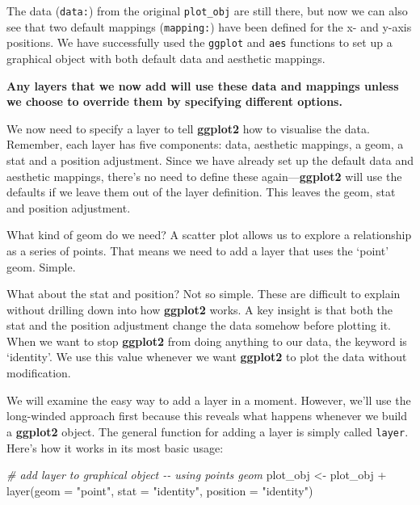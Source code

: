 \documentclass[
]{book}
\newenvironment{Shaded}{\begin{snugshade}}{\end{snugshade}}
\newcommand{\AttributeTok}[1]{\textcolor[rgb]{0.77,0.63,0.00}{#1}}
\newcommand{\CommentTok}[1]{\textcolor[rgb]{0.56,0.35,0.01}{\textit{#1}}}
\newcommand{\FunctionTok}[1]{\textcolor[rgb]{0.00,0.00,0.00}{#1}}
\newcommand{\NormalTok}[1]{#1}
\newcommand{\OtherTok}[1]{\textcolor[rgb]{0.56,0.35,0.01}{#1}}
\newcommand{\SpecialCharTok}[1]{\textcolor[rgb]{0.00,0.00,0.00}{#1}}
\newcommand{\StringTok}[1]{\textcolor[rgb]{0.31,0.60,0.02}{#1}}
\begin{document}
The data (\texttt{data:}) from the original \texttt{plot\_obj} are still there, but now we can also see that two default mappings (\texttt{mapping:}) have been defined for the x- and y-axis positions. We have successfully used the \texttt{ggplot} and \texttt{aes} functions to set up a graphical object with both default data and aesthetic mappings.

\textbf{Any layers that we now add will use these data and mappings unless we choose to override them by specifying different options.}

We now need to specify a layer to tell \textbf{ggplot2} how to visualise the data. Remember, each layer has five components: data, aesthetic mappings, a geom, a stat and a position adjustment. Since we have already set up the default data and aesthetic mappings, there's no need to define these again---\textbf{ggplot2} will use the defaults if we leave them out of the layer definition. This leaves the geom, stat and position adjustment.

What kind of geom do we need? A scatter plot allows us to explore a relationship as a series of points. That means we need to add a layer that uses the `point' geom. Simple.

What about the stat and position? Not so simple. These are difficult to explain without drilling down into how \textbf{ggplot2} works. A key insight is that both the stat and the position adjustment change the data somehow before plotting it. When we want to stop \textbf{ggplot2} from doing anything to our data, the keyword is `identity'. We use this value whenever we want \textbf{ggplot2} to plot the data without modification.

We will examine the easy way to add a layer in a moment. However, we'll use the long-winded approach first because this reveals what happens whenever we build a \textbf{ggplot2} object. The general function for adding a layer is simply called \texttt{layer}. Here's how it works in its most basic usage:

\begin{Shaded}
\begin{Highlighting}[]
\CommentTok{\# add layer to graphical object {-}{-} using points geom}
\NormalTok{plot\_obj }\OtherTok{\textless{}{-}}\NormalTok{ plot\_obj }\SpecialCharTok{+} \FunctionTok{layer}\NormalTok{(}\AttributeTok{geom =} \StringTok{"point"}\NormalTok{, }\AttributeTok{stat =} \StringTok{"identity"}\NormalTok{, }\AttributeTok{position =} \StringTok{"identity"}\NormalTok{)}
\end{Highlighting}
\end{Shaded}
\end{document}
